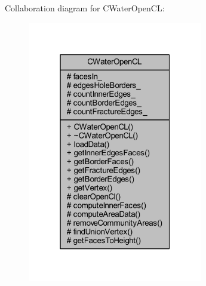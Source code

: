 Collaboration diagram for C\+Water\+Open\+CL\+:
\nopagebreak
\begin{figure}[H]
\begin{center}
\leavevmode
\includegraphics[width=217pt]{class_c_water_open_c_l__coll__graph}
\end{center}
\end{figure}
